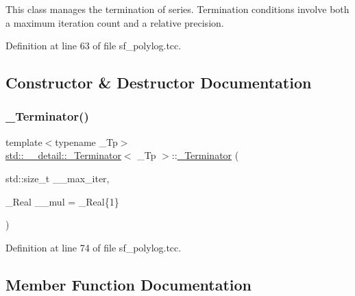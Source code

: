 This class manages the termination of series. Termination conditions involve both a maximum iteration count and a relative precision. 

Definition at line 63 of file sf\+\_\+polylog.\+tcc.



\subsection{Constructor \& Destructor Documentation}
\mbox{\label{classstd_1_1____detail_1_1__Terminator_aee41e518162f472b6e62a5477f3256d4}} 
\subsubsection{\texorpdfstring{\+\_\+\+Terminator()}{\_Terminator()}}
{\footnotesize\ttfamily template$<$typename \+\_\+\+Tp$>$ \\
\hyperlink{classstd_1_1____detail_1_1__Terminator}{std\+::\+\_\+\+\_\+detail\+::\+\_\+\+Terminator}$<$ \+\_\+\+Tp $>$\+::\hyperlink{classstd_1_1____detail_1_1__Terminator}{\+\_\+\+Terminator} (\begin{DoxyParamCaption}\item[{std\+::size\+\_\+t}]{\+\_\+\+\_\+max\+\_\+iter,  }\item[{\+\_\+\+Real}]{\+\_\+\+\_\+mul = {\ttfamily \+\_\+Real\{1\}} }\end{DoxyParamCaption})\hspace{0.3cm}{\ttfamily [inline]}}



Definition at line 74 of file sf\+\_\+polylog.\+tcc.



\subsection{Member Function Documentation}
\mbox{\label{classstd_1_1____detail_1_1__Terminator_a8797a4fa304ad360f9b101bd340d614d}} 
